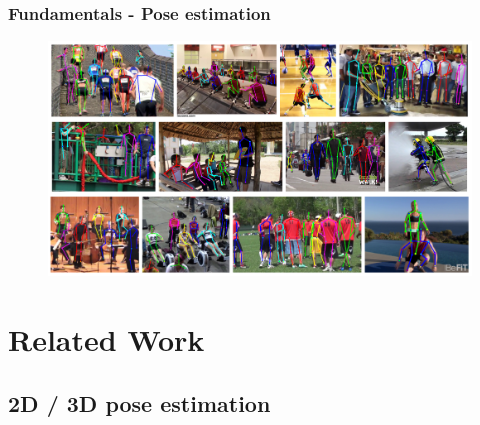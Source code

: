 \documentclass[9pt]{beamer}
\newenvironment{myframe}[1][]{%
\begin{frame}%
\frametitle{#1}
\setcounter{footnote}{0}


}{%
\end{frame}%
}
\begin{document}
\begin{myframe}[Fundamentals - Pose estimation]
    \begin{figure}
        \includegraphics[width=.99\textwidth]{pe-multihuman.png}
    \end{figure}
\end{myframe}

\section{Related Work}
\subsection{2D / 3D pose estimation}
\end{document}
